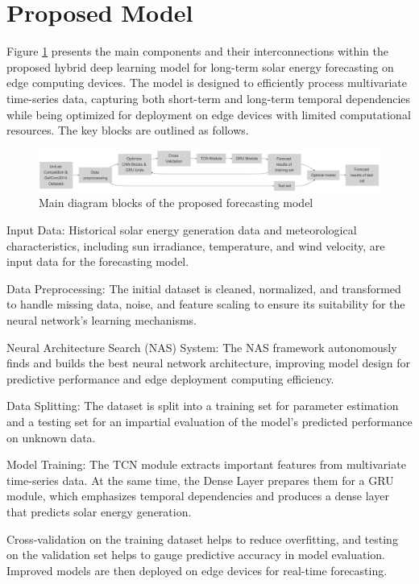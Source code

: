 \documentclass[sn-mathphys-num]{sn-jnl}%
\begin{document}
\section{Proposed Model}\label{sec3}
Figure \ref{fig:overview} presents the main components and their interconnections within the proposed hybrid deep learning model for long-term solar energy forecasting on edge computing devices. The model is designed to efficiently process multivariate time-series data, capturing both short-term and long-term temporal dependencies while being optimized for deployment on edge devices with limited computational resources. The key blocks are outlined as follows.
\begin{figure}[htbp]
  \centering
  \includegraphics[width=1.0\textwidth]{overviewv2.png}
  \caption{Main diagram blocks of the proposed forecasting model}
  \label{fig:overview}
\end{figure}

Input Data: Historical solar energy generation data and meteorological characteristics, including sun irradiance, temperature, and wind velocity, are input data for the forecasting model.

Data Preprocessing: The initial dataset is cleaned, normalized, and transformed to handle missing data, noise, and feature scaling to ensure its suitability for the neural network's learning mechanisms.

Neural Architecture Search (NAS) System: The NAS framework autonomously finds and builds the best neural network architecture, improving model design for predictive performance and edge deployment computing efficiency.

Data Splitting: The dataset is split into a training set for parameter estimation and a testing set for an impartial evaluation of the model's predicted performance on unknown data.

Model Training: The TCN module extracts important features from multivariate time-series data. At the same time, the Dense Layer prepares them for a GRU module, which emphasizes temporal dependencies and produces a dense layer that predicts solar energy generation.

Cross-validation on the training dataset helps to reduce overfitting, and testing on the validation set helps to gauge predictive accuracy in model evaluation. Improved models are then deployed on edge devices for real-time forecasting.
\end{document}
